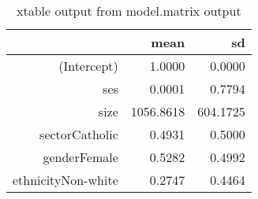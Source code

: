 \begin{table}[H]
\centering
\caption{xtable output from model.matrix output} 
\label{tab:sumry3}
\begin{tabular}{rrr}
  \hline
 & mean & sd \\ 
  \hline
(Intercept) & 1.0000 & 0.0000 \\ 
  ses & 0.0001 & 0.7794 \\ 
  size & 1056.8618 & 604.1725 \\ 
  sectorCatholic & 0.4931 & 0.5000 \\ 
  genderFemale & 0.5282 & 0.4992 \\ 
  ethnicityNon-white & 0.2747 & 0.4464 \\ 
   \hline
\end{tabular}
\end{table}
